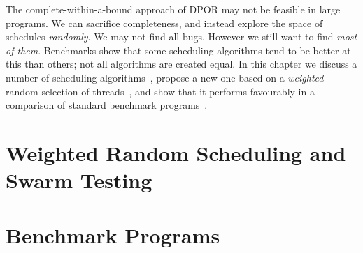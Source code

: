 The complete-within-a-bound approach of DPOR may not be feasible in large
programs.  We can sacrifice completeness, and instead explore the space of
schedules \emph{randomly}.  We may not find all bugs.  However we still want to
find \emph{most of them}.  Benchmarks show that some scheduling algorithms tend
to be better at this than others; not all algorithms are created equal.  In this
chapter we discuss a number of scheduling algorithms~,
propose a new one based on a \emph{weighted} random selection of
threads~, and show that it performs favourably in a
comparison of standard benchmark programs~.

\label{sec:algorithms-usual}

\blindtext

\section{Weighted Random Scheduling and Swarm Testing}
\label{sec:algorithms-swarm}

\blindtext

\section{Benchmark Programs}
\label{sec:algorithms-sctbench}

\blindtext
